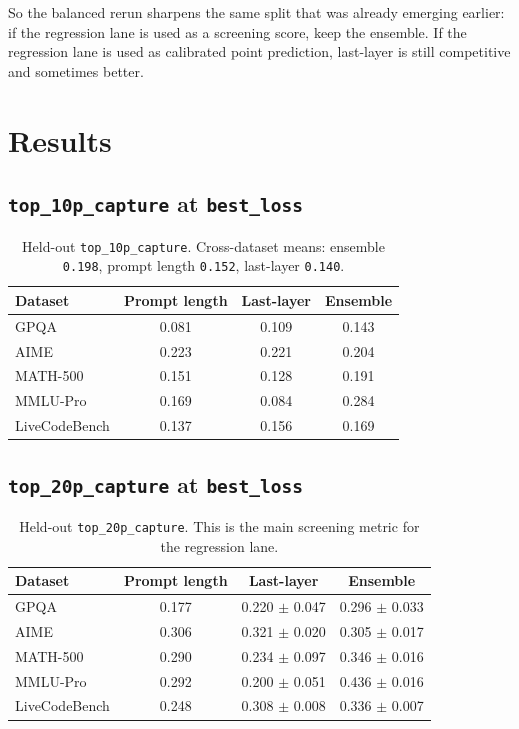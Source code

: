 \documentclass[11pt]{article}
\begin{document}
So the balanced rerun sharpens the same split that was already emerging earlier:
if the regression lane is used as a screening score, keep the ensemble.
If the regression lane is used as calibrated point prediction, last-layer is still
competitive and sometimes better.

\section{Results}

\subsection*{\texttt{top\_10p\_capture} at \texttt{best\_loss}}

\begin{table}[h]
\centering
\small
\begin{tabular}{lccc}
\toprule
Dataset & Prompt length & Last-layer & Ensemble \\
\midrule
GPQA & 0.081 & 0.109 & 0.143 \\
AIME & 0.223 & 0.221 & 0.204 \\
MATH-500 & 0.151 & 0.128 & 0.191 \\
MMLU-Pro & 0.169 & 0.084 & 0.284 \\
LiveCodeBench & 0.137 & 0.156 & 0.169 \\
\bottomrule
\end{tabular}
\caption{Held-out \texttt{top\_10p\_capture}. Cross-dataset means: ensemble \texttt{0.198}, prompt length \texttt{0.152}, last-layer \texttt{0.140}.}
\end{table}

\subsection*{\texttt{top\_20p\_capture} at \texttt{best\_loss}}

\begin{table}[h]
\centering
\small
\begin{tabular}{lccc}
\toprule
Dataset & Prompt length & Last-layer & Ensemble \\
\midrule
GPQA & 0.177 & 0.220 $\pm$ 0.047 & 0.296 $\pm$ 0.033 \\
AIME & 0.306 & 0.321 $\pm$ 0.020 & 0.305 $\pm$ 0.017 \\
MATH-500 & 0.290 & 0.234 $\pm$ 0.097 & 0.346 $\pm$ 0.016 \\
MMLU-Pro & 0.292 & 0.200 $\pm$ 0.051 & 0.436 $\pm$ 0.016 \\
LiveCodeBench & 0.248 & 0.308 $\pm$ 0.008 & 0.336 $\pm$ 0.007 \\
\bottomrule
\end{tabular}
\caption{Held-out \texttt{top\_20p\_capture}. This is the main screening metric for the regression lane.}
\end{table}
\end{document}
